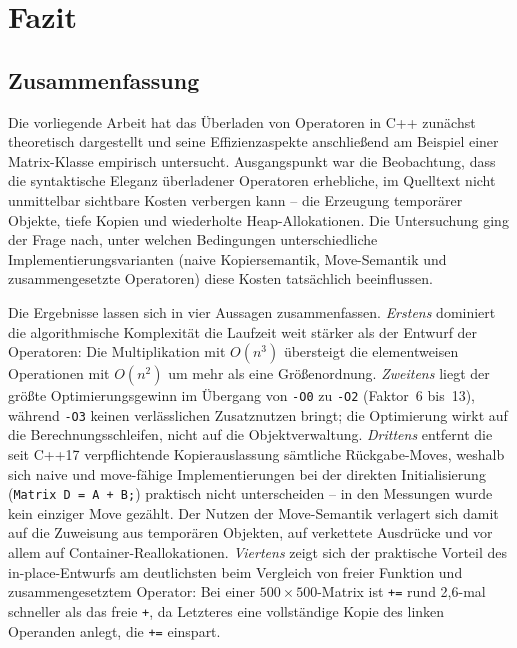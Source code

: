 \documentclass[10pt,a4paper]{article}
\begin{document}
\section{Fazit}
\label{sec:fazit}
 
\subsection{Zusammenfassung}
\label{sec:zusammenfassung}
 
Die vorliegende Arbeit hat das Überladen von Operatoren in C++ zunächst
theoretisch dargestellt und seine Effizienzaspekte anschließend am Beispiel
einer Matrix-Klasse empirisch untersucht. Ausgangspunkt war die Beobachtung,
dass die syntaktische Eleganz überladener Operatoren erhebliche, im Quelltext
nicht unmittelbar sichtbare Kosten verbergen kann -- die Erzeugung temporärer
Objekte, tiefe Kopien und wiederholte Heap-Allokationen. Die Untersuchung ging
der Frage nach, unter welchen Bedingungen unterschiedliche
Implementierungsvarianten (naive Kopiersemantik, Move-Semantik und
zusammengesetzte Operatoren) diese Kosten tatsächlich beeinflussen.
 
Die Ergebnisse lassen sich in vier Aussagen zusammenfassen. \emph{Erstens}
dominiert die algorithmische Komplexität die Laufzeit weit stärker als der
Entwurf der Operatoren: Die Multiplikation mit $O(n^3)$ übersteigt die
elementweisen Operationen mit $O(n^2)$ um mehr als eine Größenordnung.
\emph{Zweitens} liegt der größte Optimierungsgewinn im Übergang von
\texttt{-O0} zu \texttt{-O2} (Faktor~6 bis~13), während \texttt{-O3} keinen
verlässlichen Zusatznutzen bringt; die Optimierung wirkt auf die
Berechnungsschleifen, nicht auf die Objektverwaltung. \emph{Drittens} entfernt
die seit C++17 verpflichtende Kopierauslassung sämtliche Rückgabe-Moves,
weshalb sich naive und move-fähige Implementierungen bei der direkten
Initialisierung (\texttt{Matrix D = A + B;}) praktisch nicht unterscheiden --
in den Messungen wurde kein einziger Move gezählt. Der Nutzen der Move-Semantik
verlagert sich damit auf die Zuweisung aus temporären Objekten, auf verkettete
Ausdrücke und vor allem auf Container-Reallokationen. \emph{Viertens} zeigt sich
der praktische Vorteil des in-place-Entwurfs am deutlichsten beim Vergleich von
freier Funktion und zusammengesetztem Operator: Bei einer
$500\times500$-Matrix ist \texttt{+=} rund 2{,}6-mal schneller als das freie
\texttt{+}, da Letzteres eine vollständige Kopie des linken Operanden anlegt,
die \texttt{+=} einspart.
 
\end{document}
